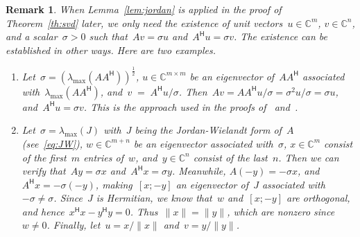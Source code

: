 \documentclass[11pt,a4paper]{article}  %
\numberwithin{equation}{section}
\newtheorem{remark}{Remark}%
\theoremstyle{definition}
\def\CC{\mathbb{C}}
\newcommand{\hmt}{{\scriptscriptstyle{{\mathsf{H}}}}}
\begin{document}

\begin{remark}
  When Lemma~\ref{lem:jordan} is applied in the proof of Theorem~\ref{th:svd} later, we only need
  the existence of unit vectors~$u\in\CC^{m}$, $v\in\CC^{n}$, and a scalar~$\sigma>0$
  such that~$Av = \sigma u$ and~$A^\hmt u = \sigma v$. The existence can be established in other
  ways. Here are two examples.
  \begin{enumerate}[leftmargin=1.5em]
    \item Let~$\sigma = (\lambda_{\max}(AA^\hmt))^{\frac{1}{2}}$, $u\in\CC^{m\times m}$ be an eigenvector
      of~$AA^\hmt$ associated with~$\lambda_{\max}(AA^\hmt)$, and~$v\;=\;A^\hmt u/\sigma$.
      Then~$Av = AA^\hmt u/\sigma = \sigma^2 u/\sigma=\sigma u$, and~$A^\hmt u = \sigma v$.
      This is the approach used
      in the proofs of~\cite[Theorem~4.1]{Trefethen_Bau_1997} and~\cite[Theorem~1]{Koranyi_2001}.
    \item Let~$\sigma = \lambda_{\max}(J)$ with~$J$ being the Jordan-Wielandt form of~$A$
      \textnormal{(}see~\eqref{eq:JW}\textnormal{)}, $w\in\CC^{m+n}$ be an eigenvector associated with~$\sigma$,
      $x\in\CC^{m}$ consist of the first~$m$ entries of~$w$, and~$y\in\CC^{n}$ consist of the
      last~$n$. Then we can verify that~$Ay=\sigma x$ and~$A^\hmt x=\sigma y$.
      Meanwhile, $A(-y) = -\sigma x$, and~$A^\hmt x = -\sigma (-y)$, making~$[x; -y]$
      an eigenvector of~$J$ associated with~$-\sigma \neq \sigma$. Since~$J$ is Hermitian,
      we know that~$w$ and~$[x; -y]$ are orthogonal, and hence~$x^\hmt x - y^\hmt y= 0$. Thus~$\|x\|=\|y\|$,
    which are nonzero since~$w\neq 0$. Finally, let~$u = x/\|x\|$ and~$v = y/\|y\|$.
  \end{enumerate}
\end{remark}
\end{document}
